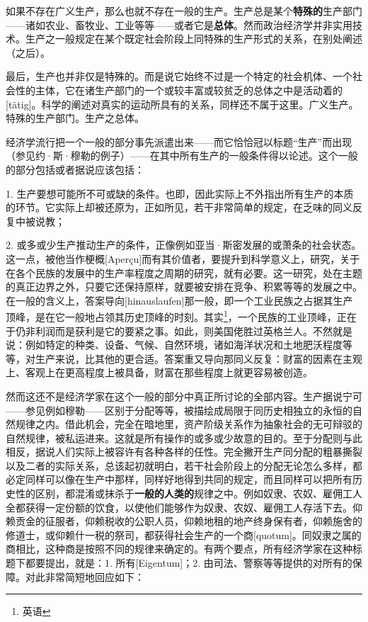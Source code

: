 \documentclass[a5paper,twoside,10.5pt]{ctexart}
\begin{document}
如果不存在广义生产，那么也就不存在一般的生产。生产总是某个\textbf{特殊的}生产部门——诸如农业、畜牧业、工业等等——或者它是\textbf{总体}。然而政治经济学并非实用技术。生产之一般规定在某个既定社会阶段上同特殊的生产形式的关系，在别处阐述（之后）。

最后，生产也并非仅是特殊的。而是说它始终不过是一个特定的社会机体、一个社会性的主体，它在诸生产部门的一个或较丰富或较贫乏的总体之中是活动着的[tätig]。科学的阐述对真实的运动所具有的关系，同样还不属于这里。广义生产。特殊的生产部门。生产之总体。

经济学流行把一个一般的部分事先派遣出来——而它恰恰冠以标题“生产”而出现（参见约·斯·穆勒的例子）——在其中所有生产的一般条件得以论述。这个一般的部分包括或者据说应该包括：

1. 生产要想可能所不可或缺的条件。也即，因此实际上不外指出所有生产的本质的环节。它实际上却被还原为，正如所见，若干非常简单的规定，在乏味的同义反复中被说教；

2. 或多或少生产推动生产的条件，正像例如亚当·斯密发展的或萧条的社会状态。这一点，被他当作梗概[Aperçu]而有其价值者，要提升到科学意义上，研究，关于在各个民族的发展中的生产率程度之周期的研究，就有必要。这一研究，处在主题的真正边界之外，只要它还保持原样，就要被安排在竞争、积累等等的发展之中。在一般的含义上，答案导向[hinauslaufen]那一般，即一个工业民族之占据其生产顶峰，是在它一般地占领其历史顶峰的时刻。其实\footnote{英语}，一个民族的工业顶峰，正在于仍非利润而是获利是它的要紧之事。如此，则美国佬胜过英格兰人。不然就是说：例如特定的种类、设备、气候、自然环境，诸如海洋状况和土地肥沃程度等等，对生产来说，比其他的更合适。答案重又导向那同义反复：财富的因素在主观上、客观上在更高程度上被具备，财富在那些程度上就更容易被创造。

然而这还不是经济学家在这个一般的部分中真正所讨论的全部内容。生产据说宁可——参见例如穆勒——区别于分配等等，被描绘成局限于同历史相独立的永恒的自然规律之内。借此机会，完全在暗地里，资产阶级关系作为抽象社会的无可辩驳的自然规律，被私运进来。这就是所有操作的或多或少故意的目的。至于分配则与此相反，据说人们实际上被容许有各种各样的任性。完全撇开生产同分配的粗暴撕裂以及二者的实际关系，总该起初就明白，若干社会阶段上的分配无论怎么多样，都必定同样可以像在生产中那样，同样好地得到共同的规定，而且同样可以把所有历史性的区别，都混淆或抹杀于\textbf{一般的人类的}规律之中。例如奴隶、农奴、雇佣工人全都获得一定份额的饮食，以使他们能够作为奴隶、农奴、雇佣工人存活下去。仰赖贡金的征服者，仰赖税收的公职人员，仰赖地租的地产终身保有者，仰赖施舍的修道士，或仰赖什一税的祭司，都获得社会生产的一个商[quotum]。同奴隶之属的商相比，这种商是按照不同的规律来确定的。有两个要点，所有经济学家在这种标题下都要提出，就是：1. 所有[Eigentum]；2. 由司法、警察等等提供的对所有的保障。对此非常简短地回应如下：
\end{document}
